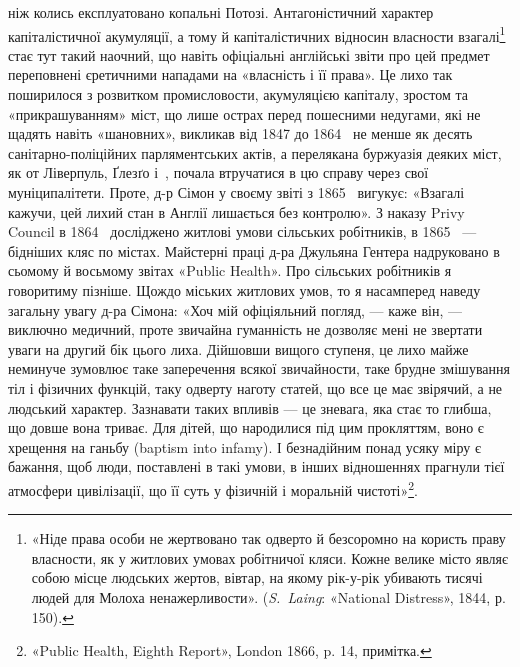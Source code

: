 \parcont{}  %
ніж колись експлуатовано копальні Потозі. Антагоністичний
характер капіталістичної акумуляції, а тому й капіталістичних
відносин власности взагалі\footnote{
«Ніде права особи не жертвовано так одверто й безсоромно на
користь праву власности, як у житлових умовах робітничої кляси. Кожне
велике місто являє собою місце людських жертов, вівтар, на якому рік-у-рік
убивають тисячі людей для Молоха ненажерливости». (\emph{S.~Laing}:
«National Distress», 1844, р. 150).
} стає тут такий наочний, що навіть
офіціальні англійські звіти про цей предмет переповнені єретичними
нападами на «власність і її права». Це лихо так поширилося
з розвитком промисловости, акумуляцією капіталу, зростом
та «прикрашуванням» міст, що лише острах перед пошесними
недугами, які не щадять навіть «шановних», викликав від 1847
до 1864~ не менше як десять санітарно-поліційних парляментських
актів, а перелякана буржуазія деяких міст, як от Ліверпуль,
Ґлезґо і~, почала втручатися в цю справу через свої
муніципалітети. Проте, д-р Сімон у своєму звіті з 1865~ вигукує:
«Взагалі кажучи, цей лихий стан в Англії лишається без
контролю». З наказу Privy Council в 1864~ досліджено житлові
умови сільських робітників, в 1865~ — бідніших кляс по містах.
Майстерні праці д-ра Джульяна Гентера надруковано в
сьомому й восьмому звітах «Public Health». Про сільських робітників
я говоритиму пізніше. Щождо міських житлових умов,
то я насамперед наведу загальну увагу д-ра Сімона: «Хоч
мій офіціяльний погляд, — каже він, — виключно медичний, проте
звичайна гуманність не дозволяє мені не звертати уваги на другий
бік цього лиха. Дійшовши вищого ступеня, це лихо майже
неминуче зумовлює таке заперечення всякої звичайности, таке
брудне змішування тіл і фізичних функцій, таку одверту наготу
статей, що все це має звірячий, а не людський характер. Зазнавати
таких впливів — це зневага, яка стає то глибша, що довше
вона триває. Для дітей, що народилися під цим прокляттям,
воно є хрещення на ганьбу (baptism into infamy). І безнадійним
понад усяку міру є бажання, щоб люди, поставлені в такі умови,
в інших відношеннях прагнули тієї атмосфери цивілізації, що її
суть у фізичній і моральній чистоті»\footnote{
«Public Health, Eighth Report», London 1866, p. 14, примітка.
}.

